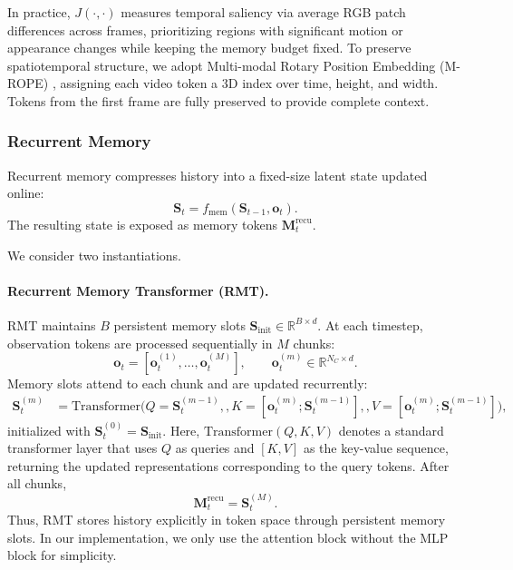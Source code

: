 In practice, $J(\cdot,\cdot)$ measures temporal saliency via average RGB patch differences across frames, prioritizing regions with significant motion or appearance changes while keeping the memory budget fixed. To preserve spatiotemporal structure, we adopt Multi-modal Rotary Position Embedding (M-ROPE) \cite{yao2025timechat}, assigning each video token a 3D index over time, height, and width. Tokens from the first frame are fully preserved to provide complete context.


\subsubsection{Recurrent Memory}

Recurrent memory compresses history into a fixed-size latent state updated online:
\[
\mathbf{S}_t = f_{\text{mem}}(\mathbf{S}_{t-1}, \mathbf{o}_t).
\]
The resulting state is exposed as memory tokens $\mathbf{M}_t^{\text{recu}}$.

We consider two instantiations.

\paragraph{Recurrent Memory Transformer (RMT).}
RMT maintains $B$ persistent memory slots
$\mathbf{S}_{\text{init}} \in \mathbb{R}^{B \times d}$.
At each timestep, observation tokens are processed sequentially in $M$ chunks:
\[
\mathbf{o}_t = [\mathbf{o}_t^{(1)}, \dots, \mathbf{o}_t^{(M)}], \qquad
\mathbf{o}_t^{(m)} \in \mathbb{R}^{N_C \times d}.
\]
Memory slots attend to each chunk and are updated recurrently:
\begin{align}
\mathbf{S}_t^{(m)}
&= \mathrm{Transformer}\big(
Q=\mathbf{S}_t^{(m-1)},,
K=[\mathbf{o}_t^{(m)};\mathbf{S}_t^{(m-1)}],,
V=[\mathbf{o}_t^{(m)};\mathbf{S}_t^{(m-1)}]
\big),
\end{align}
initialized with $\mathbf{S}_t^{(0)}=\mathbf{S}_{\text{init}}$.
Here, $\mathrm{Transformer}(Q, K, V)$ denotes a standard transformer layer that uses $Q$ as queries and $[K, V]$ as the key-value sequence, returning the updated representations corresponding to the query tokens.
After all chunks,
\[
\mathbf{M}_t^{\text{recu}} = \mathbf{S}_t^{(M)}.
\]
Thus, RMT stores history explicitly in token space through persistent memory slots. In our implementation, we only use the attention block without the MLP block for simplicity. 

